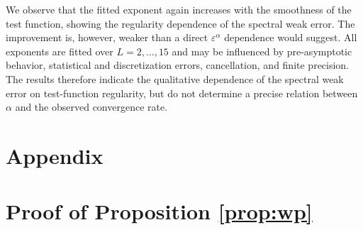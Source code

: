 \documentclass[a4paper,12pt]{article}
\begin{document}
We observe that the fitted exponent again increases with the smoothness of the test
function, showing the regularity dependence of the spectral weak error.
The improvement is, however, weaker than a direct
$\varepsilon^\alpha$ dependence would suggest. 
All exponents are fitted over $L=2,\ldots,15$ and may be influenced by pre-asymptotic behavior, statistical and discretization errors, cancellation, and finite precision. The results therefore indicate the qualitative dependence of the spectral weak error on test-function regularity, but do not determine a precise relation between $\alpha$ and the observed convergence rate.




\appendix
\section*{Appendix}
\section{Proof of Proposition \ref{prop:wp}}\label{Appendix_wp}
\end{document}
